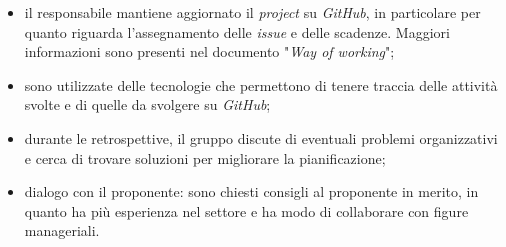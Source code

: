 \begin{itemize}
\begin{itemize}
		      \item il responsabile mantiene aggiornato il \textit{project} su
		            \textit{GitHub}, in particolare per quanto riguarda
		            l'assegnamento delle \textit{issue} e delle scadenze.
		            Maggiori informazioni sono presenti nel documento
		            "\textit{Way of working}";

		      \item sono utilizzate delle tecnologie che permettono di tenere
		            traccia delle attività svolte e di quelle da svolgere su
		            \textit{GitHub};

		      \item durante le retrospettive, il gruppo discute di eventuali
		            problemi organizzativi e cerca di trovare soluzioni per
		            migliorare la pianificazione;

		      \item dialogo con il proponente: sono chiesti consigli al
		            proponente in merito, in quanto ha più esperienza
		            nel settore e ha modo di collaborare con figure manageriali.
	      \end{itemize}
\end{itemize}
